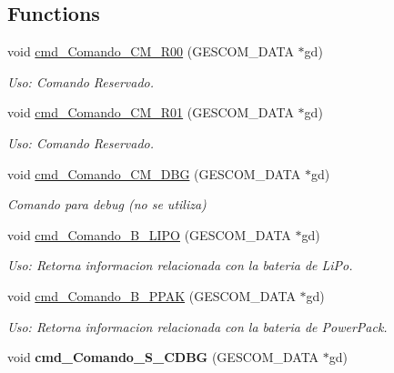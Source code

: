 \subsection*{Functions}
\begin{DoxyCompactItemize}
\item 
void \hyperlink{_gescom___m_e_g_a2560___v3___interfaz_8ino_aac57c6579cefb2d3ef3d759b7eb17792}{cmd\+\_\+\+Comando\+\_\+\+C\+M\+\_\+\+R00} (G\+E\+S\+C\+O\+M\+\_\+\+D\+A\+TA $\ast$gd)
\begin{DoxyCompactList}\small\item\em Uso\+: Comando Reservado. \end{DoxyCompactList}\item 
void \hyperlink{_gescom___m_e_g_a2560___v3___interfaz_8ino_aac7d395a871b2c8a45e0f878632d2521}{cmd\+\_\+\+Comando\+\_\+\+C\+M\+\_\+\+R01} (G\+E\+S\+C\+O\+M\+\_\+\+D\+A\+TA $\ast$gd)
\begin{DoxyCompactList}\small\item\em Uso\+: Comando Reservado. \end{DoxyCompactList}\item 
void \hyperlink{_gescom___m_e_g_a2560___v3___interfaz_8ino_a4279cb7dd4b63a73a3fcf44390b82e54}{cmd\+\_\+\+Comando\+\_\+\+C\+M\+\_\+\+D\+BG} (G\+E\+S\+C\+O\+M\+\_\+\+D\+A\+TA $\ast$gd)
\begin{DoxyCompactList}\small\item\em Comando para debug (no se utiliza) \end{DoxyCompactList}\item 
void \hyperlink{_gescom___m_e_g_a2560___v3___interfaz_8ino_a98aff49bf403ccb006895c0443025536}{cmd\+\_\+\+Comando\+\_\+\+B\+\_\+\+L\+I\+PO} (G\+E\+S\+C\+O\+M\+\_\+\+D\+A\+TA $\ast$gd)
\begin{DoxyCompactList}\small\item\em Uso\+: Retorna informacion relacionada con la bateria de Li\+Po. \end{DoxyCompactList}\item 
void \hyperlink{_gescom___m_e_g_a2560___v3___interfaz_8ino_a337a7577f586434b2b72595b1d401f0e}{cmd\+\_\+\+Comando\+\_\+\+B\+\_\+\+P\+P\+AK} (G\+E\+S\+C\+O\+M\+\_\+\+D\+A\+TA $\ast$gd)
\begin{DoxyCompactList}\small\item\em Uso\+: Retorna informacion relacionada con la bateria de Power\+Pack. \end{DoxyCompactList}\item 
void {\bfseries cmd\+\_\+\+Comando\+\_\+\+S\+\_\+\+C\+D\+BG} (G\+E\+S\+C\+O\+M\+\_\+\+D\+A\+TA $\ast$gd)\hypertarget{_gescom___m_e_g_a2560___v3___interfaz_8ino_aad1a82b3f1bc9fc116cf8a05ae4712b4}{}\label{_gescom___m_e_g_a2560___v3___interfaz_8ino_aad1a82b3f1bc9fc116cf8a05ae4712b4}


\end{DoxyCompactItemize}
